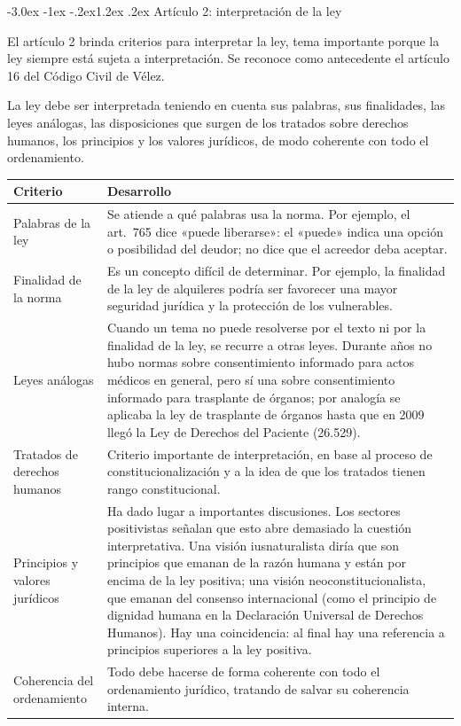 \documentclass[12pt,oneside]{book}
\makeatletter
\renewcommand\section{\@startsection{section}{1}{\z@}%
  {-3.0ex \@plus -1ex \@minus -.2ex}{1.2ex \@plus .2ex}%
  {\normalfont\large\bfseries\color{acento}}}
\makeatother
\begin{document}
\section{Artículo 2: interpretación de la ley}

El artículo 2 brinda criterios para interpretar la ley, tema importante porque la ley siempre está sujeta a interpretación. Se reconoce como antecedente el artículo 16 del Código Civil de Vélez.

\begin{regla}
La ley debe ser interpretada teniendo en cuenta sus palabras, sus finalidades, las leyes análogas, las disposiciones que surgen de los tratados sobre derechos humanos, los principios y los valores jurídicos, de modo coherente con todo el ordenamiento.
\end{regla}

\begin{table}[H]
\centering
\begin{tabularx}{\textwidth}{>{\raggedright\arraybackslash}p{} >{\raggedright\arraybackslash}X}
\toprule
\textbf{Criterio} & \textbf{Desarrollo} \\
\midrule
Palabras de la ley &
Se atiende a qué palabras usa la norma. Por ejemplo, el art.~765 dice «puede liberarse»: el «puede» indica una opción o posibilidad del deudor; no dice que el acreedor deba aceptar. \\
\addlinespace
Finalidad de la norma &
Es un concepto difícil de determinar. Por ejemplo, la finalidad de la ley de alquileres podría ser favorecer una mayor seguridad jurídica y la protección de los vulnerables. \\
\addlinespace
Leyes análogas &
Cuando un tema no puede resolverse por el texto ni por la finalidad de la ley, se recurre a otras leyes. Durante años no hubo normas sobre consentimiento informado para actos médicos en general, pero sí una sobre consentimiento informado para trasplante de órganos; por analogía se aplicaba la ley de trasplante de órganos hasta que en 2009 llegó la Ley de Derechos del Paciente (26.529). \\
\addlinespace
Tratados de derechos humanos &
Criterio importante de interpretación, en base al proceso de constitucionalización y a la idea de que los tratados tienen rango constitucional. \\
\addlinespace
Principios y valores jurídicos &
Ha dado lugar a importantes discusiones. Los sectores positivistas señalan que esto abre demasiado la cuestión interpretativa. Una visión iusnaturalista diría que son principios que emanan de la razón humana y están por encima de la ley positiva; una visión neoconstitucionalista, que emanan del consenso internacional (como el principio de dignidad humana en la Declaración Universal de Derechos Humanos). Hay una coincidencia: al final hay una referencia a principios superiores a la ley positiva. \\
\addlinespace
Coherencia del ordenamiento &
Todo debe hacerse de forma coherente con todo el ordenamiento jurídico, tratando de salvar su coherencia interna. \\
\bottomrule
\end{tabularx}
\end{table}
\end{document}
